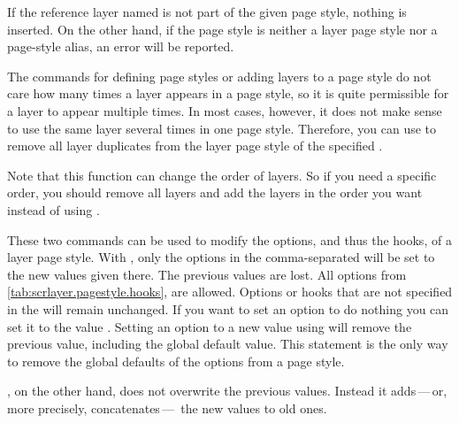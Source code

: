 If the reference layer named  is not part of the
given page style, nothing is inserted. On the other hand, if the page style is
neither a layer page style nor a page-style alias, an error will be reported.%
\EndIndexGroup


\begin{Declaration}
\end{Declaration}
%
%
The commands for defining page styles or adding layers to a page style do not
care how many times a layer appears in a page style, so it is quite
permissible for a layer to appear multiple times. In most cases, however, it
does not make sense to use the same layer several times in one page style.
Therefore, you can use  to remove all layer
duplicates from the layer page style of the specified .

Note that this function can change the order of layers.
So if you need a specific order, you should remove all layers and add the
layers in the order you want instead of using .%
\EndIndexGroup


\begin{Declaration}
\end{Declaration}
%
%
These two commands can be used to modify the options, and thus the
hooks, of a layer page style. With
, only
the options in the comma-separated  will be set to the new
values given there. The previous values are lost. All options from
\autoref{tab:scrlayer.pagestyle.hooks},
 are allowed. Options or hooks that
are not specified in the  will remain unchanged. If you
want to set an option to do nothing you can set it to the value .
Setting an option to a new value using 
will remove the previous value, including the global default value. This
statement is the only way to remove the global defaults of the \KOMAScript{}
options from a page style.

, on the
other hand, does not overwrite the previous values. Instead it adds\,---\,or,
more precisely, concatenates\,---\, the new values to old ones.%
\EndIndexGroup


